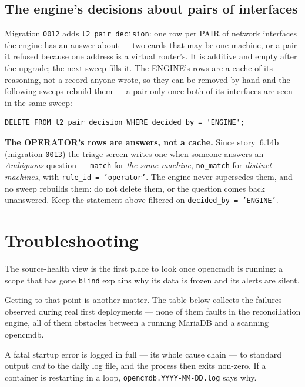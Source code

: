 \documentclass[11pt,oneside,listof=totoc,bibliography=totoc]{scrreprt}
\begin{document}
\section{The engine's decisions about pairs of interfaces}
Migration \texttt{0012} adds \texttt{l2\_pair\_decision}: one row per PAIR of network interfaces the
engine has an answer about --- two cards that may be one machine, or a pair it refused because one
address is a virtual router's. It is additive and empty after the upgrade; the next sweep fills it.
The ENGINE's rows are a cache of its reasoning, not a record anyone wrote, so they can be removed by
hand and the following sweeps rebuild them --- a pair only once both of its interfaces are seen in the
same sweep:
\begin{verbatim}
DELETE FROM l2_pair_decision WHERE decided_by = 'ENGINE';
\end{verbatim}
\textbf{The OPERATOR's rows are answers, not a cache.} Since story~6.14b (migration \texttt{0013})
the triage screen writes one when someone answers an \emph{Ambiguous} question --- \texttt{match}
for \emph{the same machine}, \texttt{no\_match} for \emph{distinct machines}, with
\texttt{rule\_id = 'operator'}. The engine never supersedes them, and no sweep rebuilds them: do
not delete them, or the question comes back unanswered. Keep the statement above filtered on
\texttt{decided\_by = 'ENGINE'}.

\appendix
\chapter{Troubleshooting}
The source-health view is the first place to look once opencmdb is running: a scope that has
gone \texttt{blind} explains why its data is frozen and its alerts are silent.

Getting to that point is another matter. The table below collects the failures observed during
real first deployments --- none of them faults in the reconciliation engine, all of them
obstacles between a running MariaDB and a scanning opencmdb.

\begin{note}
A fatal startup error is logged in full --- its whole cause chain --- to standard output
\emph{and} to the daily log file, and the process then exits non-zero. If a container is
restarting in a loop, \texttt{opencmdb.YYYY-MM-DD.log} says why.
\end{note}
\end{document}
